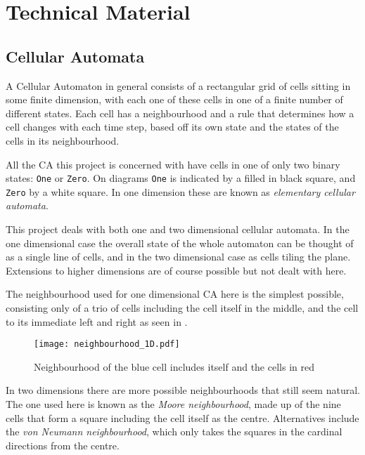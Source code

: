 \section{Technical Material}

\subsection{Cellular Automata}

A Cellular Automaton in general consists of a rectangular grid of cells sitting in some finite dimension,
with each one of these cells in one of a finite number of different states.
Each cell has a neighbourhood
and a rule that determines how a cell changes with each time step,
based off its own state and the states of the cells in its neighbourhood.

All the CA this project is concerned with have cells in one of only two binary states: \texttt{One} or \texttt{Zero}.
On diagrams \texttt{One} is indicated by a filled in black square,
and \texttt{Zero} by a white square.
In one dimension these are known as \emph{elementary cellular automata}.

This project deals with both one and two dimensional cellular automata.
In the one dimensional case the overall state of the whole automaton can be thought of as a single line of cells,
and in the two dimensional case as cells tiling the plane.
Extensions to higher dimensions are of course possible but not dealt with here.

The neighbourhood used for one dimensional CA here is the simplest possible,
consisting only of a trio of cells including the cell itself in the middle, and the cell to its immediate left and right as seen in .


\begin{figure}[h]
    \centering
    \texttt{[image: neighbourhood\_1D.pdf]}
    \caption{Neighbourhood of the {\color{blue} blue} cell includes itself and the cells in {\color{red} red}}
    \label{fig:nbhd_1D}
\end{figure}

In two dimensions there are more possible neighbourhoods that still seem natural.
The one used here is known as the \emph{Moore neighbourhood},
made up of the nine cells that form a square including the cell itself as the centre.
Alternatives include the \emph{von Neumann neighbourhood},
which only takes the squares in the cardinal directions from the centre.


